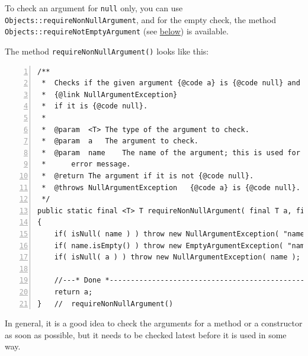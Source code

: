 \documentclass[11pt,a4paper, titlepage, parskip=half, headsepline, footsepline, cleardoublepage=current, headheight=1cm]{scrbook}
\begin{document}
To check an argument for \lstinline|null| only, you can use \lstinline|Objects::requireNonNullArgument|, and for the empty check, the method \lstinline|Objects::requireNotEmptyArgument| (see \hyperref[listing:requireNotEmptyArgument]{below}) is available.

The method \lstinline|requireNonNullArgument()| looks like this:
\begin{lstlisting}[numbers=left,caption={requireNonNullArgument()}]
/**
 *  Checks if the given argument {@code a} is {@code null} and throws a
 *  {@link NullArgumentException}
 *  if it is {@code null}.
 *
 *  @param  <T> The type of the argument to check.
 *  @param  a   The argument to check.
 *  @param  name    The name of the argument; this is used for the 
 *      error message.
 *  @return The argument if it is not {@code null}.
 *  @throws NullArgumentException   {@code a} is {@code null}.
 */
public static final <T> T requireNonNullArgument( final T a, final String name )
{
    if( isNull( name ) ) throw new NullArgumentException( "name" );
    if( name.isEmpty() ) throw new EmptyArgumentException( "name" );
    if( isNull( a ) ) throw new NullArgumentException( name );

    //---* Done *----------------------------------------------------
    return a;
}   //  requireNonNullArgument()
\end{lstlisting}

In general, it is a good idea to check the arguments for a method or a constructor as soon as possible, but it needs to be checked latest before it is used in some way.
\end{document}
